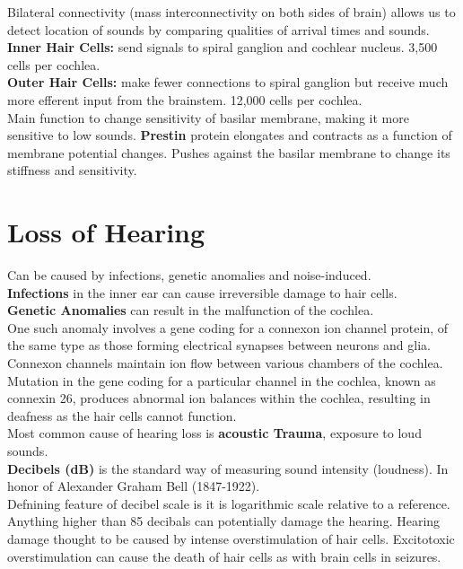 \documentclass{article}
\begin{document}
Bilateral connectivity (mass interconnectivity on both sides of brain) allows us to detect location of sounds by comparing qualities of arrival times and sounds. \\

\noindent \textbf{Inner Hair Cells:} send signals to spiral ganglion and cochlear nucleus. 3,500 cells per cochlea. \\

\noindent \textbf{Outer Hair Cells:} make fewer connections to spiral ganglion but receive much more efferent input from the brainstem. 12,000 cells per cochlea. \\
Main function to change sensitivity of basilar membrane, making it more sensitive to low sounds. \textbf{Prestin} protein elongates and contracts as a function of membrane potential changes. Pushes against the basilar membrane to change its stiffness and sensitivity. 

\newpage
\section{Loss of Hearing}
Can be caused by infections, genetic anomalies and noise-induced. \\

\noindent \textbf{Infections} in the inner ear can cause irreversible damage to hair cells.\\

\noindent \textbf{Genetic Anomalies} can result in the malfunction of the cochlea.\\
One such anomaly involves a gene coding for a connexon ion channel protein, of the same type as those forming electrical synapses between neurons and glia. Connexon channels maintain ion flow between various chambers of the cochlea. Mutation in the gene coding for a particular channel in the cochlea, known as connexin 26, produces abnormal ion balances within the cochlea, resulting in deafness as the hair cells cannot function. \\

\noindent Most common cause of hearing loss is \textbf{acoustic Trauma}, exposure to loud sounds. \\
\textbf{Decibels (dB)} is the standard way of measuring sound intensity (loudness). In honor of Alexander Graham Bell (1847-1922).  \\
Defnining feature of decibel scale is it is logarithmic scale relative to a reference. \\
Anything higher than 85 decibals can potentially damage the hearing. Hearing damage thought to be caused by intense overstimulation of hair cells. Excitotoxic overstimulation can cause the death of hair cells as with brain cells in seizures. \\
\end{document}
